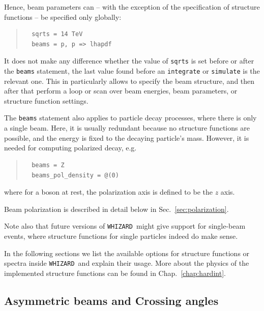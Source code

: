 \documentclass[12pt]{book}
\newcommand{\ttt}[1]{\texttt{#1}}
\newcommand{\whizard}{\ttt{WHIZARD}}
\begin{document}
Hence, beam parameters can -- with the exception of the specification
of structure functions -- be specified only globally:
\begin{quote}
\begin{footnotesize}
\begin{verbatim}
  sqrts = 14 TeV
  beams = p, p => lhapdf
\end{verbatim}
\end{footnotesize}
\end{quote}
It does not make any difference whether the value of \ttt{sqrts} is
set before or after the \ttt{beams} statement, the last value found
before an \ttt{integrate} or \ttt{simulate} is the relevant one. This
in particularly allows to specify the beam structure, and then after
that perform a loop or scan over beam energies, beam parameters, or
structure function settings.

The \ttt{beams} statement also applies to particle decay processes, where there
is only a single beam.  Here, it is usually redundant because no structure
functions are possible, and the energy is fixed to the decaying particle's
mass.  However, it is needed for computing polarized decay, e.g.
\begin{quote}
\begin{footnotesize}
\begin{verbatim}
  beams = Z
  beams_pol_density = @(0)
\end{verbatim}
\end{footnotesize}
\end{quote}
where for a boson at rest, the polarization axis is defined to be the $z$
axis.

Beam polarization is described in detail below in Sec.~\ref{sec:polarization}.

Note also that future versions of \whizard\ might give support for
single-beam events, where structure functions for single particles
indeed do make sense.

In the following sections we list the available options for structure
functions or spectra inside \whizard\ and explain their usage. More
about the physics of the implemented structure functions can be found
in Chap.~\ref{chap:hardint}.


\subsection{Asymmetric beams and Crossing angles}
\label{sec:asymmetricbeams}
\end{document}
